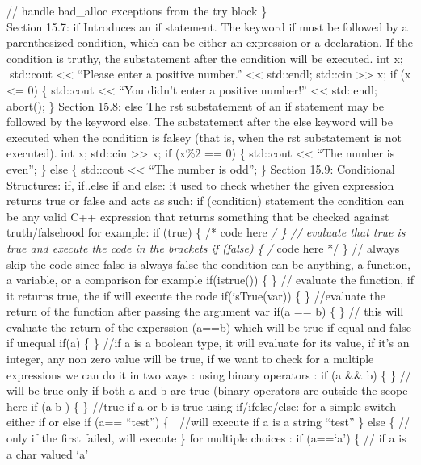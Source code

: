 // handle bad\_alloc exceptions from the try block \}\\
Section 15.7: if Introduces an if statement. The keyword if must be
followed by a parenthesized condition, which can be either an expression
or a declaration. If the condition is truthy, the substatement after the
condition will be executed. int x; std::cout \textless\textless{}
``Please enter a positive number.'' \textless\textless{} std::endl;
std::cin \textgreater\textgreater{} x; if (x \textless= 0) \{ std::cout
\textless\textless{} ``You didn't enter a positive number!''
\textless\textless{} std::endl; abort(); \} Section 15.8: else The rst
substatement of an if statement may be followed by the keyword else. The
substatement after the else keyword will be executed when the condition
is falsey (that is, when the rst substatement is not executed). int x;
std::cin \textgreater\textgreater{} x; if (x\%2 == 0) \{ std::cout
\textless\textless{} ``The number is even\n''; \} else \{ std::cout
\textless\textless{} ``The number is odd\n''; \} Section 15.9:
Conditional Structures: if, if..else if and else: it used to check
whether the given expression returns true or false and acts as such: if
(condition) statement the condition can be any valid C++ expression that
returns something that be checked against truth/falsehood for example:
if (true) \{ /* code here \emph{/ \} // evaluate that true is true and
execute the code in the brackets if (false) \{ /} code here */ \} //
always skip the code since false is always false the condition can be
anything, a function, a variable, or a comparison for example
if(istrue()) \{ \} // evaluate the function, if it returns true, the if
will execute the code if(isTrue(var)) \{ \} //evaluate the return of the
function after passing the argument var if(a == b) \{ \} // this will
evaluate the return of the experssion (a==b) which will be true if equal
and false if unequal if(a) \{ \} //if a is a boolean type, it will
evaluate for its value, if it's an integer, any non zero value will be
true, if we want to check for a multiple expressions we can do it in two
ways : using binary operators : if (a \&\& b) \{ \} // will be true only
if both a and b are true (binary operators are outside the scope here if
(a \textbar\textbar{} b ) \{ \} //true if a or b is true using
if/ifelse/else: for a simple switch either if or else if (a== ``test'')
\{  //will execute if a is a string ``test'' \} else \{ // only if the
first failed, will execute \} for multiple choices : if (a==`a') \{ //
if a is a char valued `a'\\
